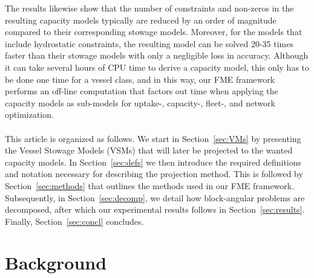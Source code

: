 The results likewise show that the number of constraints and non-zeros in the resulting capacity models typically are reduced by an order of magnitude compared to their corresponding stowage models. Moreover, for the models that include hydrostatic constraints, the resulting model can be solved 20-35 times faster than their stowage models with only a negligible loss in accuracy. Although it can take several hours of CPU time to derive a capacity model, this only has to be done one time for a vessel class, and in this way, our FME framework performs an off-line computation that factors out time when applying the capacity models as sub-models for uptake-, capacity-, fleet-, and network optimization.
\\\\
This article is organized as follows. We start in Section~\ref{sec:VMs} by presenting the Vessel Stowage Models (VSMs) that will later be projected to the wanted capacity models. In Section~\ref{sec:defs} we then introduce the required definitions and notation necessary for describing the projection method. This is followed by Section~\ref{sec:methods} that outlines the methods used in our FME framework. Subsequently, in Section~\ref{sec:decomp}, we detail how block-angular problems are decomposed, after which our experimental results follows in Section~\ref{sec:results}. Finally, Section~\ref{sec:concl} concludes.

\section{Background}


